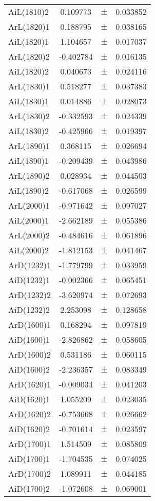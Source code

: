 \begin{table}
\begin{tiny}
\begin{tabular}{lccc}
AiL(1810)2 & 0.109773 & $\pm$ & 0.033852 \\
ArL(1820)1 & 0.188795 & $\pm$ & 0.038165 \\
AiL(1820)1 & 1.104657 & $\pm$ & 0.017037 \\
ArL(1820)2 & -0.402784 & $\pm$ & 0.016135 \\
AiL(1820)2 & 0.040673 & $\pm$ & 0.024116 \\
ArL(1830)1 & 0.518277 & $\pm$ & 0.037383 \\
AiL(1830)1 & 0.014886 & $\pm$ & 0.028073 \\
ArL(1830)2 & -0.332593 & $\pm$ & 0.024339 \\
AiL(1830)2 & -0.425966 & $\pm$ & 0.019397 \\
ArL(1890)1 & 0.368115 & $\pm$ & 0.026694 \\
AiL(1890)1 & -0.209439 & $\pm$ & 0.043986 \\
ArL(1890)2 & 0.028934 & $\pm$ & 0.044503 \\
AiL(1890)2 & -0.617068 & $\pm$ & 0.026599 \\
ArL(2000)1 & -0.971642 & $\pm$ & 0.097027 \\
AiL(2000)1 & -2.662189 & $\pm$ & 0.055386 \\
ArL(2000)2 & -0.484616 & $\pm$ & 0.061896 \\
AiL(2000)2 & -1.812153 & $\pm$ & 0.041467 \\
ArD(1232)1 & -1.779799 & $\pm$ & 0.033959 \\
AiD(1232)1 & -0.002366 & $\pm$ & 0.065451 \\
ArD(1232)2 & -3.620974 & $\pm$ & 0.072693 \\
AiD(1232)2 & 2.253098 & $\pm$ & 0.128658 \\
ArD(1600)1 & 0.168294 & $\pm$ & 0.097819 \\
AiD(1600)1 & -2.826862 & $\pm$ & 0.058605 \\
ArD(1600)2 & 0.531186 & $\pm$ & 0.060115 \\
AiD(1600)2 & -2.236357 & $\pm$ & 0.083349 \\
ArD(1620)1 & -0.009034 & $\pm$ & 0.041203 \\
AiD(1620)1 & 1.055209 & $\pm$ & 0.023035 \\
ArD(1620)2 & -0.753668 & $\pm$ & 0.026662 \\
AiD(1620)2 & -0.701614 & $\pm$ & 0.023597 \\
ArD(1700)1 & 1.514509 & $\pm$ & 0.085809 \\
AiD(1700)1 & -1.704535 & $\pm$ & 0.074025 \\
ArD(1700)2 & 1.089911 & $\pm$ & 0.044185 \\
AiD(1700)2 & -1.072608 & $\pm$ & 0.069001 \\
\bottomrule
\end{tabular}
\end{tiny}
\end{table}


